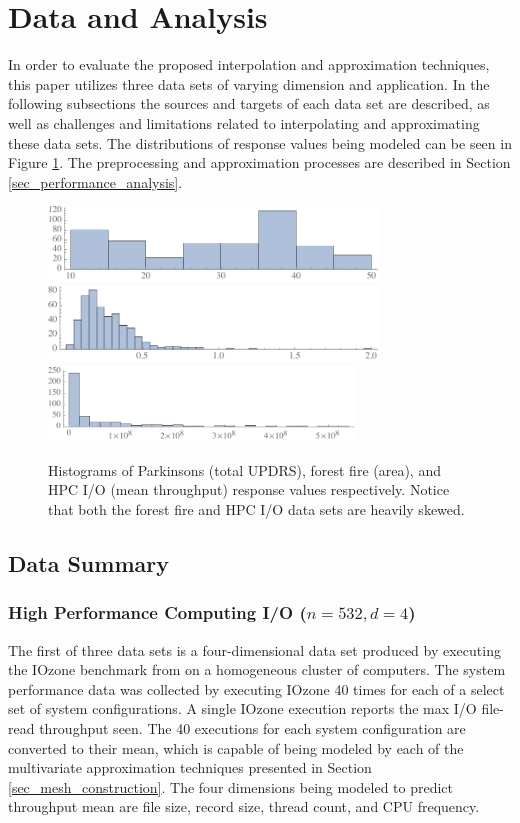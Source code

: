 \documentclass[smallextended]{svjour3}       %
\begin{document}
\section{Data and Analysis}
In order to evaluate the proposed interpolation and approximation techniques, this paper utilizes three data sets of varying dimension and application. In the following subsections the sources and targets of each data set are described, as well as challenges and limitations related to interpolating and approximating these data sets. The distributions of response values being modeled can be seen in Figure \ref{fig_response_hists}. The preprocessing and approximation processes are described in Section \ref{sec_performance_analysis}.

\begin{figure}
  \includegraphics[width=.5\textwidth,height=2cm]{Figures/p-hist.pdf}
  \includegraphics[width=.5\textwidth,height=2cm]{Figures/f-hist.pdf}
  \includegraphics[width=.5\textwidth,height=2cm]{Figures/h-hist.pdf}
  \caption{Histograms of Parkinsons (total UPDRS), forest fire (area), and HPC I/O (mean throughput) response values respectively. Notice that both the forest fire and HPC I/O data sets are heavily skewed.
  \vspace{-.5cm}}
  \label{fig_response_hists}
\end{figure}

\subsection{Data Summary}

\subsubsection{High Performance Computing I/O ($n = 532, d = 4$)}
The first of three data sets is a four-dimensional data set produced by executing the IOzone benchmark from \cite{iozone} on a homogeneous cluster of computers. The system performance data was collected by executing IOzone 40 times for each of a select set of system configurations. A single IOzone execution reports the max I/O file-read throughput seen. The 40 executions for each system configuration are converted to their mean, which is capable of being modeled by each of the multivariate approximation techniques presented in Section \ref{sec_mesh_construction}. The four dimensions being modeled to predict throughput mean are file size, record size, thread count, and CPU frequency.
\end{document}
